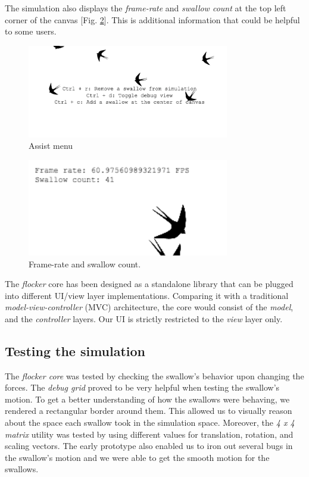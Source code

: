 \documentclass[../main]{subfiles}
\begin{document}
The simulation also displays the {\em frame-rate} and {\em swallow count} at the top left corner of the canvas [Fig. \ref{canvasExtraInfo}]. This is additional information that could be helpful to some users.

\begin{figure}
	\centering
	\includegraphics[scale=0.36, width=250pt, frame]{resources/meta_assist_menu.png}
	\caption{Assist menu}
	\label{metaAssistMenu}
\end{figure}

\begin{figure}
	\centering
	\includegraphics[scale=0.35, width=250pt, frame]{resources/additional_canvas_text.png}
	\caption{Frame-rate and swallow count.}
	\label{canvasExtraInfo}
\end{figure}

The {\em flocker} core has been designed as a standalone \mbox{library} that can be plugged into different UI/view layer \mbox{implementations}. Comparing it with a traditional \mbox{\em model-view-controller} (MVC) architecture, the core would consist of the {\em model}, and the {\em controller} layers. Our UI is strictly restricted to the {\em view} layer only.

\subsection{Testing the simulation}
\label{flockerTesting}

The {\em flocker core} was tested by checking the swallow's behavior upon changing the forces. The {\em debug grid} proved to be very helpful when testing the swallow's motion. To get a better understanding of how the swallows were behaving, we rendered a rectangular border around them. This allowed us to visually reason about the space each swallow took in the simulation space. Moreover, the {\em 4 x 4 matrix} utility was tested by using different values for translation, rotation, and scaling vectors. The early prototype \cite{flockerProto} also enabled us to iron out several bugs in the swallow's motion and we were able to get the smooth motion for the swallows.
\end{document}
